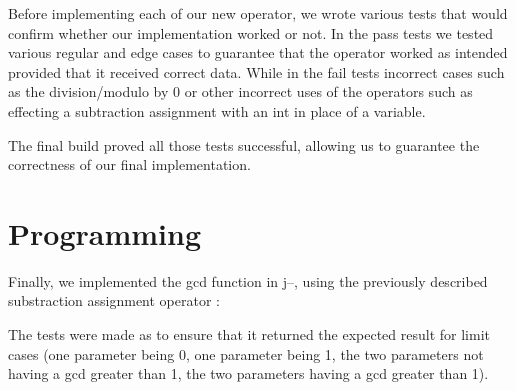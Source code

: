\documentclass{article}
\begin{document}
    Before implementing each of our new operator, we wrote various tests that would 
    confirm whether our implementation worked or not. In the pass tests we tested various
    regular and edge cases to guarantee that the operator worked as intended provided that it
    received correct data. While in the fail tests incorrect cases such as the 
    division/modulo by 0 or other incorrect uses of the operators such as 
    effecting a subtraction assignment with an int in place of a variable. \newline
    
    The final build proved all those tests successful, allowing us 
    to guarantee the correctness of our final implementation.
    
    \section{Programming}
    
    Finally, we implemented the gcd function in j--, using the previously described 
    substraction assignment operator :
    
    
    
    The tests were made as to ensure that it returned the expected result for
    limit cases (one parameter being 0, one parameter being 1, the two
    parameters not having a gcd greater than 1, the two parameters having
    a gcd greater than 1).
\end{document}
